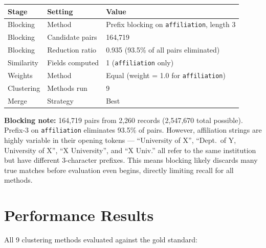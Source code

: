 \documentclass[11pt, a4paper]{article}
\begin{document}
\begin{table}[h!]
\centering
\begin{tabular}{lll}
\toprule
\textbf{Stage} & \textbf{Setting} & \textbf{Value} \\
\midrule
Blocking   & Method          & Prefix blocking on \texttt{affiliation}, length 3 \\
Blocking   & Candidate pairs & 164,719 \\
Blocking   & Reduction ratio & 0.935 (93.5\% of all pairs eliminated) \\
Similarity & Fields computed & 1 (\texttt{affiliation} only) \\
Weights    & Method          & Equal (weight = 1.0 for \texttt{affiliation}) \\
Clustering & Methods run     & 9 \\
Merge      & Strategy        & Best \\
\bottomrule
\end{tabular}
\end{table}

\textbf{Blocking note:} 164,719 pairs from 2,260 records (2,547,670 total possible).
Prefix-3 on \texttt{affiliation} eliminates 93.5\% of pairs. However, affiliation strings are
highly variable in their opening tokens --- ``University of X'', ``Dept.\ of Y, University of
X'', ``X University'', and ``X Univ.'' all refer to the same institution but have different
3-character prefixes. This means blocking likely discards many true matches before evaluation
even begins, directly limiting recall for all methods.

\section{Performance Results}

All 9 clustering methods evaluated against the gold standard:
\end{document}
